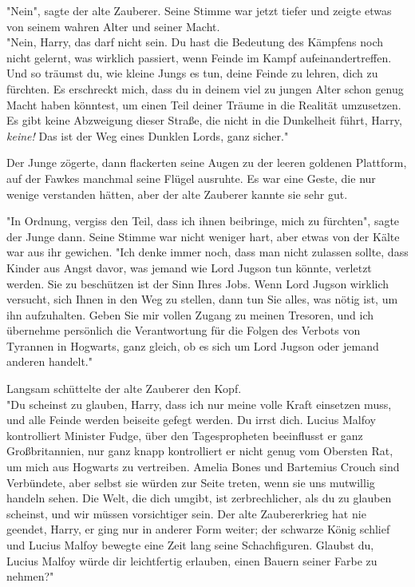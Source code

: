 {"Nein", sagte der alte Zauberer. Seine Stimme war jetzt tiefer und zeigte etwas von seinem wahren Alter und seiner Macht.\\ "Nein, Harry, das darf nicht sein. Du hast die Bedeutung des Kämpfens noch nicht gelernt, was wirklich passiert, wenn Feinde im Kampf aufeinandertreffen. Und so träumst du, wie kleine Jungs es tun, deine Feinde zu lehren, dich zu fürchten. Es erschreckt mich, dass du in deinem viel zu jungen Alter schon genug Macht haben könntest, um einen Teil deiner Träume in die Realität umzusetzen. Es gibt keine Abzweigung dieser Straße, die nicht in die Dunkelheit führt, Harry, \emph{keine!} Das ist der Weg eines Dunklen Lords, ganz sicher."

Der Junge zögerte, dann flackerten seine Augen zu der leeren goldenen Plattform, auf der Fawkes manchmal seine Flügel ausruhte. Es war eine Geste, die nur wenige verstanden hätten, aber der alte Zauberer kannte sie sehr gut.

"In Ordnung, vergiss den Teil, dass ich ihnen beibringe, mich zu fürchten", sagte der Junge dann. Seine Stimme war nicht weniger hart, aber etwas von der Kälte war aus ihr gewichen. "Ich denke immer noch, dass man nicht zulassen sollte, dass Kinder aus Angst davor, was jemand wie Lord Jugson tun könnte, verletzt werden. Sie zu beschützen ist der Sinn Ihres Jobs. Wenn Lord Jugson wirklich versucht, sich Ihnen in den Weg zu stellen, dann tun Sie alles, was nötig ist, um ihn aufzuhalten. Geben Sie mir vollen Zugang zu meinen Tresoren, und ich übernehme persönlich die Verantwortung für die Folgen des Verbots von Tyrannen in Hogwarts, ganz gleich, ob es sich um Lord Jugson oder jemand anderen handelt."

Langsam schüttelte der alte Zauberer den Kopf.\\ "Du scheinst zu glauben, Harry, dass ich nur meine volle Kraft einsetzen muss, und alle Feinde werden beiseite gefegt werden. Du irrst dich. Lucius Malfoy kontrolliert Minister Fudge, über den Tagespropheten beeinflusst er ganz Großbritannien, nur ganz knapp kontrolliert er nicht genug vom Obersten Rat, um mich aus Hogwarts zu vertreiben. Amelia Bones und Bartemius Crouch sind Verbündete, aber selbst sie würden zur Seite treten, wenn sie uns mutwillig handeln sehen. Die Welt, die dich umgibt, ist zerbrechlicher, als du zu glauben scheinst, und wir müssen vorsichtiger sein. Der alte Zaubererkrieg hat nie geendet, Harry, er ging nur in anderer Form weiter; der schwarze König schlief und Lucius Malfoy bewegte eine Zeit lang seine Schachfiguren. Glaubst du, Lucius Malfoy würde dir leichtfertig erlauben, einen Bauern seiner Farbe zu nehmen?"

}
